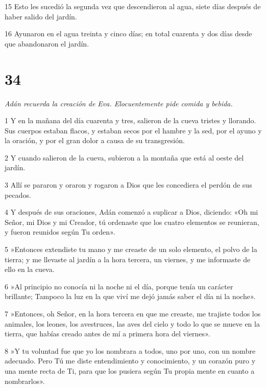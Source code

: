 \par 15 Esto les sucedió la segunda vez que descendieron al agua, siete días después de haber salido del jardín.

\par 16 Ayunaron en el agua treinta y cinco días; en total cuarenta y dos días desde que abandonaron el jardín.

\chapter{34}

\par \textit{Adán recuerda la creación de Eva. Elocuentemente pide comida y bebida.}

\par 1 Y en la mañana del día cuarenta y tres, salieron de la cueva tristes y llorando. Sus cuerpos estaban flacos, y estaban secos por el hambre y la sed, por el ayuno y la oración, y por el gran dolor a causa de su transgresión.

\par 2 Y cuando salieron de la cueva, subieron a la montaña que está al oeste del jardín.

\par 3 Allí se pararon y oraron y rogaron a Dios que les concediera el perdón de sus pecados.

\par 4 Y después de sus oraciones, Adán comenzó a suplicar a Dios, diciendo: «Oh mi Señor, mi Dios y mi Creador, tú ordenaste que los cuatro elementos se reunieran, y fueron reunidos según Tu orden».

\par 5 »Entonces extendiste tu mano y me creaste de un solo elemento, el polvo de la tierra; y me llevaste al jardín a la hora tercera, un viernes, y me informaste de ello en la cueva.

\par 6 »Al principio no conocía ni la noche ni el día, porque tenía un carácter brillante; Tampoco la luz en la que viví me dejó jamás saber el día ni la noche».

\par 7 »Entonces, oh Señor, en la hora tercera en que me creaste, me trajiste todos los animales, los leones, los avestruces, las aves del cielo y todo lo que se mueve en la tierra, que habías creado antes de mí a primera hora del viernes».

\par 8 »Y tu voluntad fue que yo los nombrara a todos, uno por uno, con un nombre adecuado. Pero Tú me diste entendimiento y conocimiento, y un corazón puro y una mente recta de Ti, para que los pusiera según Tu propia mente en cuanto a nombrarlos».

